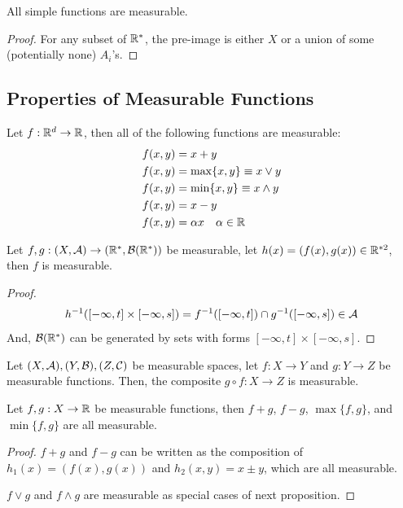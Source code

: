 \documentclass[11pt]{article}
\begin{document}
	\begin{proposition}
		All simple functions are measurable.
		\begin{proof}
			For any subset of $\mathbb{R}^*$, the pre-image is either $X$ or a union of some (potentially none) $A_i$'s.
		\end{proof}
	\end{proposition}
	
	\subsection{Properties of Measurable Functions}
	
	\begin{example}
		Let $f: \mathbb{R}^d \to \mathbb{R}$, then all of the following functions are measurable:
		\begin{align}
			f(x, y) &= x + y \\
			f(x, y) &= \max\{x, y\} \equiv x \lor y \\
			f(x, y) &= \min\{x, y\} \equiv x \land y \\
			f(x, y) &= x - y \\
			f(x, y) &= \alpha x\quad \alpha \in \mathbb{R}
		\end{align}
	\end{example}
	
	\begin{proposition}
		Let $f, g: (X, \mathcal{{A}}) \to (\mathbb{R}^*, \mathcal{{B}}(\mathbb{R}^*))$ be measurable, let $h(x) = (f(x), g(x)) \in \mathbb{R}^{*2}$, then $f$ is measurable.
		\begin{proof}
			\begin{align}
				h^{-1}([-\infty, t] \times [-\infty, s]) = f^{-1}([-\infty, t]) \cap g^{-1}([-\infty, s]) \in \mathcal{{A}}
			\end{align}
			And, $\mathcal{{B}}(\mathbb{R}^*)$ can be generated by sets with forms $[-\infty, t] \times [-\infty, s]$.
		\end{proof}
	\end{proposition}
	
	\begin{proposition}
		Let $(X, \mathcal{{A}}), (Y, \mathcal{{B}}), (Z, \mathcal{{C}})$ be measurable spaces, let $f: X \to Y$ and $g: Y \to Z$ be measurable functions. Then, the composite $g \circ f: X \to Z$ is measurable.
	\end{proposition}
	
	\begin{corollary}
		Let $f, g: X \to \mathbb{R}$ be measurable functions, then $f+g$, $f-g$, $\max\{f,g\}$, and $\min\{f,g\}$ are all measurable.
		\begin{proof}
			$f+g$ and $f-g$ can be written as the composition of $h_1(x) = (f(x), g(x))$ and $h_2(x, y) = x \pm y$, which are all measurable.
			
			$f \lor g$ and $f \land g$ are measurable as special cases of next proposition.
		\end{proof}
	\end{corollary}
	
\end{document}
